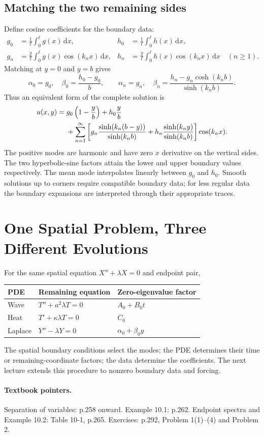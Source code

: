 \documentclass[11pt,a4paper]{article}
\newcommand{\dd}{\,\mathrm{d}}
\begin{document}
\subsection{Matching the two remaining sides}
Define cosine coefficients for the boundary data:
\begin{align}
 g_0&=\frac1\ell\int_0^\ell g(x)\dd x,&
 h_0&=\frac1\ell\int_0^\ell h(x)\dd x,\\
 g_n&=\frac2\ell\int_0^\ell g(x)\cos(k_nx)\dd x,&
 h_n&=\frac2\ell\int_0^\ell h(x)\cos(k_nx)\dd x\quad(n\ge1).
\end{align}
Matching at $y=0$ and $y=b$ gives
\begin{equation}
 \alpha_0=g_0,\quad \beta_0=\frac{h_0-g_0}{b},\qquad
 \alpha_n=g_n,\quad
 \beta_n=\frac{h_n-g_n\cosh(k_nb)}{\sinh(k_nb)}.
\end{equation}
Thus an equivalent form of the complete solution is
\begin{align}
 u(x,y)={}&g_0\left(1-\frac yb\right)+h_0\frac yb\notag\\
 &+\sum_{n=1}^\infty\left[
  g_n\frac{\sinh(k_n(b-y))}{\sinh(k_nb)}
 +h_n\frac{\sinh(k_ny)}{\sinh(k_nb)}\right]\cos(k_nx).
\end{align}
The positive modes are harmonic and have zero $x$ derivative on the vertical
sides. The two hyperbolic-sine factors attain the lower and upper boundary
values respectively. The mean mode interpolates linearly between $g_0$ and $h_0$.
Smooth solutions up to corners require compatible boundary data; for less regular
data the boundary expansions are interpreted through their appropriate traces.

\section*{One Spatial Problem, Three Different Evolutions}
For the same spatial equation $X''+\lambda X=0$ and endpoint pair,
\begin{center}
\begin{tabular}{@{}lll@{}}
\toprule
PDE & Remaining equation & Zero-eigenvalue factor\\
\midrule
Wave & $T''+a^2\lambda T=0$ & $A_0+B_0t$\\
Heat & $T'+\kappa\lambda T=0$ & $C_0$\\
Laplace & $Y''-\lambda Y=0$ & $\alpha_0+\beta_0y$\\
\bottomrule
\end{tabular}
\end{center}
The spatial boundary conditions select the modes; the PDE determines their
time or remaining-coordinate factors; the data determine the coefficients.
The next lecture extends this procedure to nonzero boundary data and forcing.

\paragraph{Textbook pointers.}
Separation of variables: p.258 onward. Example 10.1: p.262.
Endpoint spectra and Example 10.2: Table 10-1, p.265.
Exercises: p.292, Problem 1(1)--(4) and Problem 2.
\end{document}
